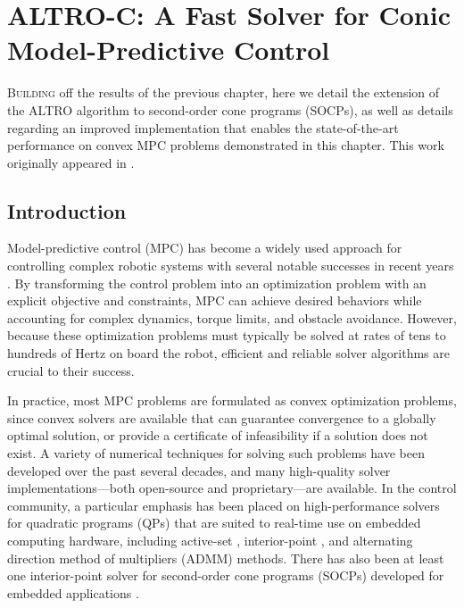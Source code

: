 \documentclass[../root.tex]{subfiles}
\begin{document}
\chapter{ALTRO-C: A Fast Solver for Conic Model-Predictive Control} \label{chap:altro_c}

\lettrine{B}{uilding} off the results of the previous chapter, here we detail the extension of the
ALTRO algorithm to second-order cone programs (SOCPs), as well as details regarding
an improved implementation that enables the state-of-the-art performance on convex 
MPC problems demonstrated in this chapter. 
This work originally appeared in \cite{jackson_ALTROC_2021}.

\section{Introduction}
    Model-predictive control 
    (MPC) has become a widely used approach for
    controlling complex robotic systems with several notable successes in
    recent years
    \cite{blackmore_Autonomous_2016,kuindersma_Optimizationbased_2016,carlo_Dynamic_2018}.
    By transforming the control problem into an optimization problem with an
    explicit objective and constraints, MPC can achieve desired behaviors
    while accounting for complex dynamics, torque limits, and obstacle
    avoidance. However, because these optimization problems must typically be
    solved at rates of tens to hundreds of Hertz on board the robot,
    efficient and reliable solver algorithms are crucial to their success.
    
    In practice, most MPC problems are formulated as convex optimization
    problems, since convex solvers are available that can guarantee
    convergence to a globally optimal solution, or provide a certificate of
    infeasibility if a solution does not exist. A variety of numerical
    techniques for solving such problems have been developed over the past
    several decades, and many high-quality solver implementations---both
    open-source and proprietary---are available. In the control community, a
    particular emphasis has been placed on high-performance solvers for
    quadratic programs (QPs) that are suited to real-time use on embedded
    computing hardware, including active-set \cite{ferreau_QpOASES_2014}
    \cite{kuindersma_Efficiently_2014}, interior-point
    \cite{frison_Efficient_2014,frison_Highperformance_2014, frison_HPIPM_2020}, 
    and alternating
    direction method of multipliers (ADMM) \cite{stellato_OSQP_2020} methods. There has
    also been at least one interior-point solver for second-order cone
    programs (SOCPs) developed for embedded applications \cite{domahidi_ECOS_2013}.
   
\end{document}
